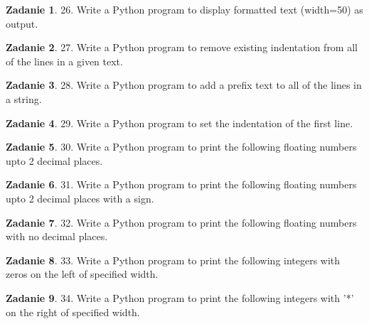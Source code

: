 \documentclass[11pt]{article}
\theoremstyle{definition}
\newtheorem{zadanie}{Zadanie}
\begin{document}
\begin{zadanie}


26. Write a Python program to display formatted text (width=50) as output. 

\end{zadanie}

\begin{zadanie}


27. Write a Python program to remove existing indentation from all of the lines in a given text. 

\end{zadanie}

\begin{zadanie}


28. Write a Python program to add a prefix text to all of the lines in a string. 

\end{zadanie}

\begin{zadanie}


29. Write a Python program to set the indentation of the first line. 

\end{zadanie}

\begin{zadanie}


30. Write a Python program to print the following floating numbers upto 2 decimal places. 

\end{zadanie}

\begin{zadanie}


31. Write a Python program to print the following floating numbers upto 2 decimal places with a sign. 

\end{zadanie}

\begin{zadanie}


32. Write a Python program to print the following floating numbers with no decimal places. 

\end{zadanie}

\begin{zadanie}


33. Write a Python program to print the following integers with zeros on the left of specified width. 

\end{zadanie}

\begin{zadanie}


34. Write a Python program to print the following integers with '*' on the right of specified width. 

\end{zadanie}
\end{document}
